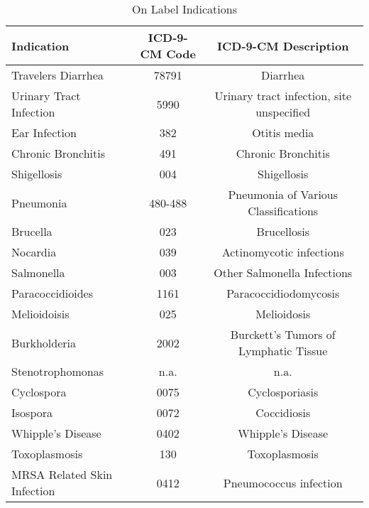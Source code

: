 \begin{table}[htbp]\centering
\def\sym#1{\ifmmode^{#1}\else\(^{#1}\)\fi}
\caption{On Label Indications\label{tab1}}
\begin{tabular}{l*{2}{c}}
\hline\hline
            Indication&\multicolumn{1}{c}{ICD-9-CM Code}&\multicolumn{1}{c}{ICD-9-CM Description}\\
\hline
Travelers Diarrhea    &     78791&       Diarrhea\\
[1em]
Urinary Tract Infection    &     5990&       Urinary tract infection, site unspecified\\
[1em]
Ear Infection    &     382&       Otitis media\\
[1em]
Chronic Bronchitis    &     491&       Chronic Bronchitis\\
[1em]
Shigellosis    &     004&       Shigellosis\\
[1em]
Pneumonia    &     480-488&       Pneumonia of Various Classifications\\
[1em]
Brucella    &     023&       Brucellosis\\
[1em]
Nocardia    &     039&       Actinomycotic infections\\
[1em]
Salmonella    &     003&       Other Salmonella Infections\\
[1em]
Paracoccidioides    &     1161&       Paracoccidiodomycosis\\
[1em]
Melioidoisis    &     025&       Melioidosis\\
[1em]
Burkholderia    &     2002&       Burckett's Tumors of Lymphatic Tissue\\
[1em]
Stenotrophomonas    &     n.a.&       n.a.\\
[1em]
Cyclospora    &     0075&       Cyclosporiasis\\
[1em]
Isospora    &     0072&       Coccidiosis\\
[1em]
Whipple's Disease    &     0402&       Whipple's Disease\\
[1em]
Toxoplasmosis    &     130&       Toxoplasmosis\\
[1em]
MRSA Related Skin Infection    &     0412&       Pneumococcus infection\\
\hline\hline
\end{tabular}
\label{tab:Table4.1}
\end{table}
